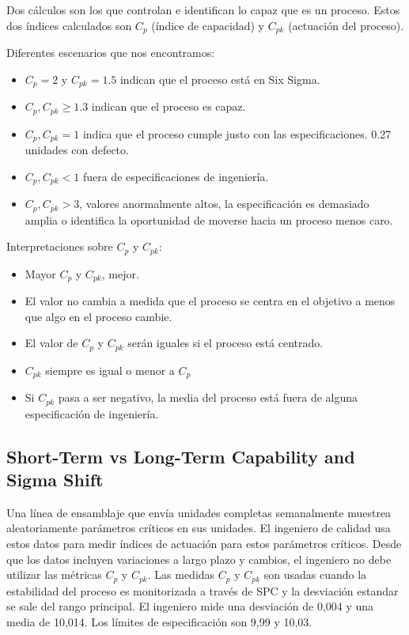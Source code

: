 \documentclass[]{article}
\begin{document}
Dos cálculos son los que controlan e identifican lo capaz que es un proceso. Estos dos índices calculados son $C_p$ (índice de capacidad) y $C_{pk}$ (actuación del proceso).

Diferentes escenarios que nos encontramos: 
\begin{itemize}
	\item $C_p = 2$ y $C_{pk} = 1.5$ indican que el proceso está en Six Sigma.
	\item $C_p, C_{pk} \geq 1.3$ indican que el proceso es capaz.
	\item $C_p, C_{pk} = 1$ indica que el proceso cumple justo con las especificaciones. 0.27 unidades con defecto.
	\item $C_p, C_{pk} < 1$ fuera de especificaciones de ingeniería.
	\item $C_p, C_{pk} > 3$, valores anormalmente altos, la especificación es demasiado amplia o identifica la oportunidad de moverse hacia un proceso menos caro.
\end{itemize}

Interpretaciones sobre $C_p$ y $C_{pk}$:
\begin{itemize}
	\item Mayor $C_p$ y $C_{pk}$, mejor.
	\item El valor no cambia a medida que el proceso se centra en el objetivo a menos que algo en el proceso cambie.
	\item El valor de $C_p$ y $C_{pk}$ serán iguales si el proceso está centrado.
	\item $C_{pk}$ siempre es igual o menor a $C_p$
	\item Si $C_{pk}$ pasa a ser negativo, la media del proceso está fuera de alguna especificación de ingeniería.
\end{itemize}

\subsection{Short-Term vs Long-Term Capability and Sigma Shift}

Una línea de ensamblaje que envía unidades completas semanalmente muestrea aleatoriamente parámetros críticos en sus unidades. El ingeniero de calidad usa estos datos para medir índices de actuación para estos parámetros críticos. Desde que los datos incluyen variaciones a largo plazo y cambios, el ingeniero no debe utilizar las métricas $C_p$ y $C_{pk}$. Las medidas $C_p$ y $C_{pk}$ son usadas cuando la estabilidad del proceso es monitorizada a través de SPC y la desviación estandar se sale del rango principal. El ingeniero mide una desviación de 0,004 y una media de 10,014. Los límites de especificación son 9,99 y 10,03.
\end{document}
